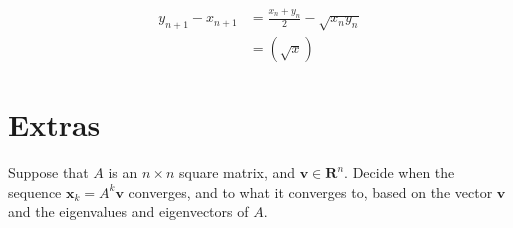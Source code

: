 \documentclass[../main.tex]{subfiles}
\begin{document}
\begin{align*}
	y_{n + 1} - x_{n + 1} & = \frac{x_n + y_n}{2} - \sqrt{x_n y_n} \\
	                      & = (\sqrt{x} )
\end{align*}

\section{Extras}
\begin{problem}
Suppose that $A$ is an $n \times n$ square matrix, and $\mathbf{v} \in \mathbf{R}^n$.
Decide when the sequence $\mathbf{x}_k = A^k\mathbf{v}$ converges, and to what it converges to, based on the vector $\mathbf{v}$ and the eigenvalues and eigenvectors of $A$.
\end{problem}
\end{document}
